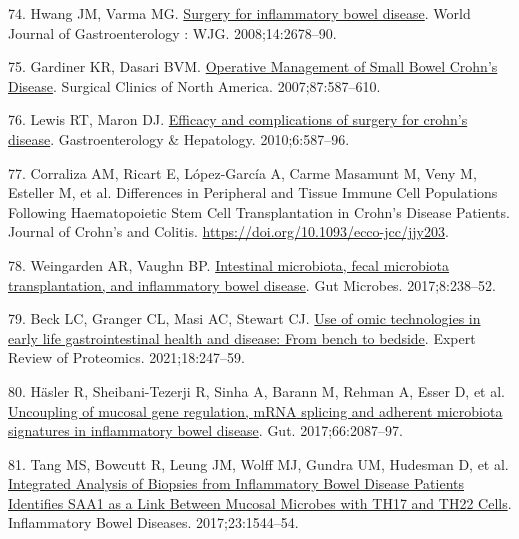 \documentclass[
  12pt,
  a4paper,
  twoside,
  openright]{book}
\newlength{\cslhangindent}
\newlength{\cslentryspacingunit} %
\newenvironment{CSLReferences}[2] %
 {%
  \setlength{\parindent}{0pt}
  \ifodd #1
  \let\oldpar\par
  \def\par{\hangindent=\cslhangindent\oldpar}
  \fi
  \setlength{\parskip}{#2\cslentryspacingunit}
 }%
 {}
\begin{document}
\begin{CSLReferences}{0}{0}
\leavevmode{}%
74. Hwang JM, Varma MG. \href{https://doi.org/10.3748/wjg.14.2678}{Surgery for inflammatory bowel disease}. World Journal of Gastroenterology : WJG. 2008;14:2678--90.

\leavevmode{}%
75. Gardiner KR, Dasari BVM. \href{https://doi.org/10.1016/j.suc.2007.03.011}{Operative Management of Small Bowel Crohn's Disease}. Surgical Clinics of North America. 2007;87:587--610.

\leavevmode{}%
76. Lewis RT, Maron DJ. \href{https://www.ncbi.nlm.nih.gov/pmc/articles/PMC2976865/}{Efficacy and complications of surgery for crohn's disease}. Gastroenterology \& Hepatology. 2010;6:587--96.

\leavevmode{}%
77. Corraliza AM, Ricart E, López-García A, Carme Masamunt M, Veny M, Esteller M, et al. Differences in Peripheral and Tissue Immune Cell Populations Following Haematopoietic Stem Cell Transplantation in Crohn{'}s Disease Patients. Journal of Crohn's and Colitis. \url{https://doi.org/10.1093/ecco-jcc/jjy203}.

\leavevmode{}%
78. Weingarden AR, Vaughn BP. \href{https://doi.org/10.1080/19490976.2017.1290757}{Intestinal microbiota, fecal microbiota transplantation, and inflammatory bowel disease}. Gut Microbes. 2017;8:238--52.

\leavevmode{}%
79. Beck LC, Granger CL, Masi AC, Stewart CJ. \href{https://doi.org/10.1080/14789450.2021.1922278}{Use of omic technologies in early life gastrointestinal health and disease: From bench to bedside}. Expert Review of Proteomics. 2021;18:247--59.

\leavevmode{}%
80. Häsler R, Sheibani-Tezerji R, Sinha A, Barann M, Rehman A, Esser D, et al. \href{https://doi.org/10.1136/gutjnl-2016-311651}{Uncoupling of mucosal gene regulation, {mRNA} splicing and adherent microbiota signatures in inflammatory bowel disease}. Gut. 2017;66:2087--97.

\leavevmode{}%
81. Tang MS, Bowcutt R, Leung JM, Wolff MJ, Gundra UM, Hudesman D, et al. \href{https://doi.org/10.1097/MIB.0000000000001208}{Integrated Analysis of Biopsies from Inflammatory Bowel Disease Patients Identifies SAA1 as a Link Between Mucosal Microbes with TH17 and TH22 Cells}. Inflammatory Bowel Diseases. 2017;23:1544--54.


\end{CSLReferences}
\end{document}
